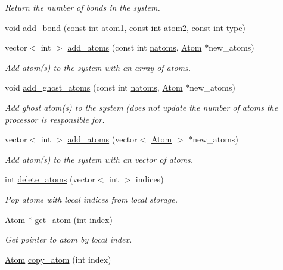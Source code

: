 \begin{DoxyCompactItemize}
\begin{DoxyCompactList}\small\item\em Return the number of bonds in the system. \end{DoxyCompactList}\item 
void \hyperlink{classSystem_a9247ae66b5bcb1614098184534173c7e}{add\-\_\-bond} (const int atom1, const int atom2, const int type)
\item 
vector$<$ int $>$ \hyperlink{classSystem_a18414259029791b3ee347eec3726f70a}{add\-\_\-atoms} (const int \hyperlink{classSystem_a92088c8b2f7416199537a7e7f3152aff}{natoms}, \hyperlink{structAtom}{Atom} $\ast$new\-\_\-atoms)
\begin{DoxyCompactList}\small\item\em Add atom(s) to the system with an array of atoms. \end{DoxyCompactList}\item 
void \hyperlink{classSystem_a57b78a811d645a98999e32c9d1a3e520}{add\-\_\-ghost\-\_\-atoms} (const int \hyperlink{classSystem_a92088c8b2f7416199537a7e7f3152aff}{natoms}, \hyperlink{structAtom}{Atom} $\ast$new\-\_\-atoms)
\begin{DoxyCompactList}\small\item\em Add ghost atom(s) to the system (does not update the number of atoms the processor is responsible for. \end{DoxyCompactList}\item 
vector$<$ int $>$ \hyperlink{classSystem_a25243a7d9f3d58f6ce7c9d2699c0924e}{add\-\_\-atoms} (vector$<$ \hyperlink{structAtom}{Atom} $>$ $\ast$new\-\_\-atoms)
\begin{DoxyCompactList}\small\item\em Add atom(s) to the system with an vector of atoms. \end{DoxyCompactList}\item 
int \hyperlink{classSystem_a32e588844500d6ae56f5a7ac9a65014f}{delete\-\_\-atoms} (vector$<$ int $>$ indices)
\begin{DoxyCompactList}\small\item\em Pop atoms with local indices from local storage. \end{DoxyCompactList}\item 
\hypertarget{classSystem_acc3e9636aa22693652559b987b71b279}{\hyperlink{structAtom}{Atom} $\ast$ \hyperlink{classSystem_acc3e9636aa22693652559b987b71b279}{get\-\_\-atom} (int index)}\label{classSystem_acc3e9636aa22693652559b987b71b279}

\begin{DoxyCompactList}\small\item\em Get pointer to atom by local index. \end{DoxyCompactList}\item 
\hypertarget{classSystem_ad8a11a6960742e6265851f805f1e42ab}{\hyperlink{structAtom}{Atom} \hyperlink{classSystem_ad8a11a6960742e6265851f805f1e42ab}{copy\-\_\-atom} (int index)}\label{classSystem_ad8a11a6960742e6265851f805f1e42ab}


\end{DoxyCompactItemize}
